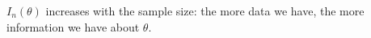 %

\begin{remark}
$I_n(\theta)$ increases with the sample size: the more data we have, the more information we have about $\theta$.
\end{remark}

